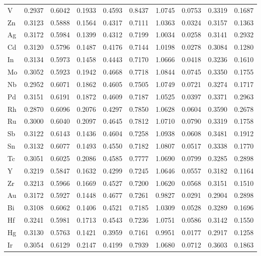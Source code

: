\begin{table}[h]
{\begin{tabular}{*{10}{l}}
      V  & 0.2937 & 0.6042 & 0.1933 & 0.4593 & 0.8437 & 1.0745 & 0.0753 & 0.3319 & 0.1687 \\
      Zn & 0.3123 & 0.5888 & 0.1564 & 0.4317 & 0.7111 & 1.0363 & 0.0324 & 0.3157 & 0.1363 \\
      Ag & 0.3172 & 0.5984 & 0.1399 & 0.4312 & 0.7199 & 1.0034 & 0.0258 & 0.3141 & 0.2932 \\
      Cd & 0.3120 & 0.5796 & 0.1487 & 0.4176 & 0.7144 & 1.0198 & 0.0278 & 0.3084 & 0.1280 \\
      In & 0.3134 & 0.5973 & 0.1458 & 0.4443 & 0.7170 & 1.0666 & 0.0418 & 0.3236 & 0.1610 \\
      Mo & 0.3052 & 0.5923 & 0.1942 & 0.4668 & 0.7718 & 1.0844 & 0.0745 & 0.3350 & 0.1755 \\
      Nb & 0.2952 & 0.6071 & 0.1862 & 0.4605 & 0.7505 & 1.0749 & 0.0721 & 0.3274 & 0.1717 \\
      Pd & 0.3151 & 0.6191 & 0.1872 & 0.4609 & 0.7187 & 1.0525 & 0.0397 & 0.3371 & 0.2963 \\
      Rh & 0.2870 & 0.6096 & 0.2076 & 0.4297 & 0.7850 & 1.0628 & 0.0604 & 0.3590 & 0.2678 \\
      Ru & 0.3000 & 0.6040 & 0.2097 & 0.4645 & 0.7812 & 1.0710 & 0.0790 & 0.3319 & 0.1758 \\
      Sb & 0.3122 & 0.6143 & 0.1436 & 0.4604 & 0.7258 & 1.0938 & 0.0608 & 0.3481 & 0.1912 \\
      Sn & 0.3132 & 0.6077 & 0.1493 & 0.4550 & 0.7182 & 1.0807 & 0.0517 & 0.3338 & 0.1770 \\
      Tc & 0.3051 & 0.6025 & 0.2086 & 0.4585 & 0.7777 & 1.0690 & 0.0799 & 0.3285 & 0.2898 \\
      Y  & 0.3219 & 0.5847 & 0.1632 & 0.4299 & 0.7245 & 1.0646 & 0.0557 & 0.3182 & 0.1164 \\
      Zr & 0.3213 & 0.5966 & 0.1669 & 0.4527 & 0.7200 & 1.0620 & 0.0568 & 0.3151 & 0.1510 \\
      Au & 0.3172 & 0.5927 & 0.1448 & 0.4677 & 0.7261 & 0.9827 & 0.0291 & 0.2904 & 0.2898 \\
      Bi & 0.3108 & 0.6062 & 0.1406 & 0.4521 & 0.7185 & 1.0309 & 0.0528 & 0.3289 & 0.1696 \\
      Hf & 0.3241 & 0.5981 & 0.1713 & 0.4543 & 0.7236 & 1.0751 & 0.0586 & 0.3142 & 0.1550 \\
      Hg & 0.3130 & 0.5763 & 0.1421 & 0.3959 & 0.7161 & 0.9951 & 0.0177 & 0.2917 & 0.1258 \\
      Ir & 0.3054 & 0.6129 & 0.2147 & 0.4199 & 0.7939 & 1.0680 & 0.0712 & 0.3603 & 0.1863 \\

\end{tabular}}
\end{table}

